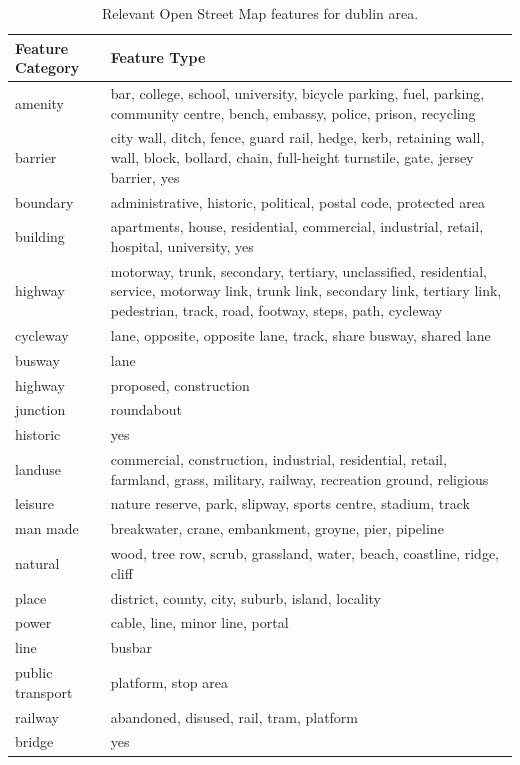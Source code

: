 \documentclass[]{elsarticle} %
\begin{document}
\begin{table}[t]

\caption{\label{tab:all-OSM-features}Relevant Open Street Map features for dublin area.}
\centering
\fontsize{8}{10}\selectfont
\begin{tabular}{l>{\raggedright\arraybackslash}p{3in}}
\toprule
Feature Category & Feature Type\\
\midrule
amenity & bar, college, school, university, bicycle parking, fuel, parking, community centre, bench, embassy, police, prison, recycling\\
barrier & city wall, ditch, fence, guard rail, hedge, kerb, retaining wall, wall, block, bollard, chain, full-height turnstile, gate, jersey barrier, yes\\
boundary & administrative, historic, political, postal code, protected area\\
building & apartments, house, residential, commercial, industrial, retail, hospital, university, yes\\
highway & motorway, trunk, secondary, tertiary, unclassified, residential, service, motorway link, trunk link, secondary link, tertiary link, pedestrian, track, road, footway, steps, path, cycleway\\
cycleway & lane, opposite, opposite lane, track, share busway, shared lane\\
busway & lane\\
highway & proposed, construction\\
junction & roundabout\\
historic & yes\\
landuse & commercial, construction, industrial, residential, retail, farmland, grass, military, railway, recreation ground, religious\\
leisure & nature reserve, park, slipway, sports centre, stadium, track\\
man made & breakwater, crane, embankment, groyne, pier, pipeline\\
natural & wood, tree row, scrub, grassland, water, beach, coastline, ridge, cliff\\
place & district, county, city, suburb, island, locality\\
power & cable, line, minor line, portal\\
line & busbar\\
public transport & platform, stop area\\
railway & abandoned, disused, rail, tram, platform\\
bridge & yes\\

\end{tabular}
\end{table}
\end{document}
